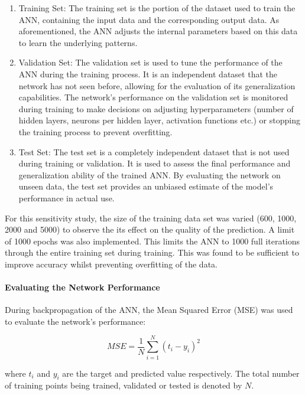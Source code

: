\begin{enumerate}
	\item Training Set: The training set is the portion of the dataset used to train the ANN, containing the input data and the corresponding output data. As aforementioned, the ANN adjusts the internal parameters based on this data to learn the underlying patterns.
	\item Validation Set: The validation set is used to tune the performance of the ANN during the training process. It is an independent dataset that the network has not seen before, allowing for the evaluation of its generalization capabilities. The network's performance on the validation set is monitored during training to make decisions on adjusting hyperparameters (number of hidden layers, neurons per hidden layer, activation functions etc.) or stopping the training process to prevent overfitting.
	\item Test Set: The test set is a completely independent dataset that is not used during training or validation. It is used to assess the final performance and generalization ability of the trained ANN. By evaluating the network on unseen data, the test set provides an unbiased estimate of the model's performance in actual use.
\end{enumerate}

For this sensitivity study, the size of the training data set was varied (600, 1000, 2000 and 5000) to observe the its effect on the quality of the prediction. A limit of 1000 epochs was also implemented. This limits the ANN to 1000 full iterations through the entire training set during training. This was found to be sufficient to improve accuracy whilst preventing overfitting of the data.

\paragraph{Evaluating the Network Performance}

During backpropagation of the ANN, the Mean Squared Error (MSE) was used to evaluate the network's performance:

\begin{equation}\label{MSE}
	M S E=\frac{1}{N} \sum_{i=1}^N\left(t_i-y_i\right)^2
\end{equation}

where $t_i$ and $y_i$ are the target and predicted value respectively. The total number of training points being trained, validated or tested is denoted by $N$. 

